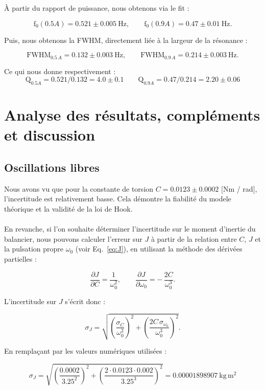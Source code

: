 \vspace{0.5cm}
À partir du rapport de puissance, nous obtenons via le fit :

\[
	\mathrm{f_0}(0.5A) = 0.521 \pm 0.005~\mathrm{Hz}, \qquad
\mathrm{f_0}(0.9A) = 0.47 \pm 0.01~\mathrm{Hz}.
\]

Puis, nous obtenons la FWHM, directement liée à la largeur de la résonance :

\[
\mathrm{FWHM}_{0.5\,A} = 0.132 \pm 0.003~\mathrm{Hz}, \qquad
\mathrm{FWHM}_{0.9\,A} = 0.214 \pm 0.003~\mathrm{Hz}.
\]

Ce qui nous donne respectivement :
\[
	\mathrm{Q}_{0.5A} = 0.521 / 0.132 = 4.0 \pm 0.1 \qquad
	\mathrm{Q}_{0.9A} = 0.47 / 0.214 = 2.20 \pm 0.06
\]
\label{val:q}


\section{Analyse des résultats, compléments et discussion}
\label{sec:analyse}
\subsection{Oscillations libres}

Nous avons vu que pour la constante de torsion $C = 0.0123 \pm 0.0002$ [Nm / rad], l'incertitude est relativement basse. Cela démontre la fiabilité du modele théorique et la validité de la loi de Hook.
\\
\\
En revanche, si l'on souhaite déterminer l'incertitude sur le moment d'inertie du balancier,
nous pouvons calculer l'erreur sur $J$ à partir de la relation entre $C$, $J$ et la pulsation propre
$\omega_0$ (voir Eq.~\ref{eq:J}), en utilisant la méthode des dérivées partielles :

\[
\frac{\partial J}{\partial C} = \frac{1}{\omega_0^2},
\qquad
\frac{\partial J}{\partial \omega_0}
= -\,\frac{2C}{\omega_0^3}.
\]

L'incertitude sur $J$ s'écrit donc :

\[
\sigma_J = 
\sqrt{
\left( \frac{\sigma_C}{\omega_0^2} \right)^2
+
\left( \frac{2C\,\sigma_{\omega_0}}{\omega_0^3} \right)^2
}.
\]

En remplaçant par les valeurs numériques utilisées :

\[
\sigma_J =
\sqrt{
\left( \frac{0.0002}{3.25^2} \right)^2 +
\left( \frac{2 \cdot 0.0123 \cdot 0.002}{3.25^3} \right)^2
}
= 0.00001898907 ~\mathrm{kg\,m^2}
\]

